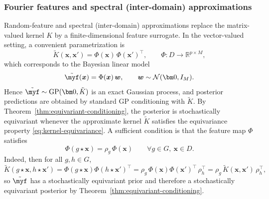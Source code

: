 \documentclass[11pt,a4paper]{article}
\newcommand{\bx}{\boldsymbol{x}}
\begin{document}
\subsubsection{Fourier features and spectral (inter-domain) approximations}
\label{subsec:conseq-rff}
Random-feature and spectral (inter-domain) approximations replace the matrix-valued kernel $K$ by a finite-dimensional
feature surrogate.
In the vector-valued setting, a convenient parametrization is
\begin{displaymath}\tilde K(\bx,\bx')=\Phi(\bx)\,\Phi(\bx')^\top, \qquad \Phi: D\to\mathbb R^{p\times M},\end{displaymath}
which corresponds to the Bayesian linear model
\begin{displaymath}\tilde{\myf}(\bx)=\Phi(\bx)\,\boldsymbol{w},\qquad \boldsymbol{w}\sim\mathcal N(\bm 0,I_M).\end{displaymath}
Hence $\tilde{\myf}\sim\mathrm{GP}(\bm 0,\tilde K)$ is an {exact} Gaussian process, and posterior predictions are obtained by standard GP conditioning with $\tilde K$. By Theorem~\ref{thm:equivariant-conditioning}, the posterior is stochastically equivariant whenever the approximate kernel $\tilde K$ satisfies the equivariance property \eqref{eq:kernel-equivariance}. A sufficient condition is that the feature map $\Phi$ satisfies
\begin{displaymath}\Phi(g\star \bx)=\rho_g\,\Phi(\bx)\qquad \forall g\in G,\ \bx\in D.\end{displaymath}
Indeed, then for all $g,h\in G$,
\begin{displaymath}\tilde K(g\star \bx,h\star \bx') =\Phi(g\star \bx)\Phi(h\star \bx')^\top =\rho_g\,\Phi(\bx)\Phi(\bx')^\top\,\rho_h^\top =\rho_g\,\tilde K(\bx,\bx')\,\rho_h^\top,\end{displaymath}
so $\tilde{\myf}$ has a stochastically equivariant prior and therefore a stochastically equivariant posterior by
Theorem~\ref{thm:equivariant-conditioning}.
\end{document}
